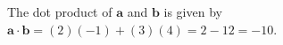 The dot product of $\mathbf{a}$ and $\mathbf{b}$ is given by $\mathbf{a} \cdot \mathbf{b} = (2)(-1) + (3)(4) = 2 - 12 = -10$.
